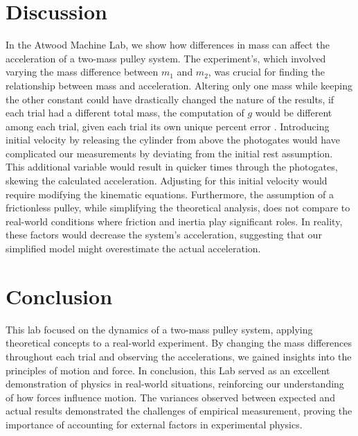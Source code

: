 \documentclass{report}
\begin{document}
    \section{Discussion}
    \bigbreak \noindent 
    In the Atwood Machine Lab, we show how differences in mass can affect the acceleration of a two-mass pulley system. The experiment's, which involved varying the mass difference between $m_1$ and $m_2$, was crucial for finding the relationship between mass and acceleration. Altering only one mass while keeping the other constant could have drastically changed the nature of the results, if each trial had a different total mass, the computation of $g$ would be different among each trial, given  each trial its own unique percent error .
    \bigbreak \noindent 
    Introducing initial velocity by releasing the cylinder from above the photogates would have complicated our measurements by deviating from the initial rest assumption. This additional variable would result in quicker times through the photogates, skewing the calculated acceleration. Adjusting for this initial velocity would require modifying the kinematic equations.
    \bigbreak \noindent 
    Furthermore, the assumption of a frictionless pulley, while simplifying the theoretical analysis, does not compare to real-world conditions where friction and inertia play significant roles. In reality, these factors would decrease the system's acceleration, suggesting that our simplified model might overestimate the actual acceleration. 

    \bigbreak \noindent 
    \section{Conclusion}
    \bigbreak \noindent 
    This lab focused on the dynamics of a two-mass pulley system, applying theoretical concepts to a real-world experiment. By changing the mass differences throughout each trial and observing the accelerations, we gained insights into the principles of motion and force. 
    \bigbreak \noindent 
    In conclusion, this Lab served as an excellent demonstration of physics in real-world situations, reinforcing our understanding of how forces influence motion. The variances observed between expected and actual results demonstrated the challenges of empirical measurement, proving the importance of accounting for external factors in experimental physics.










    
\end{document}
